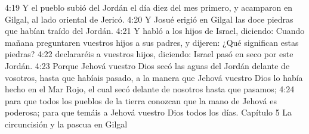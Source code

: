 4:19 Y el pueblo subió del Jordán el día diez del mes primero, y acamparon en Gilgal, al lado oriental de Jericó.  
4:20 Y Josué erigió en Gilgal las doce piedras que habían traído del Jordán.  
4:21 Y habló a los hijos de Israel, diciendo: Cuando mañana preguntaren vuestros hijos a sus padres, y dijeren: ¿Qué significan estas piedras?  
4:22 declararéis a vuestros hijos, diciendo: Israel pasó en seco por este Jordán.  
4:23 Porque Jehová vuestro Dios secó las aguas del Jordán delante de vosotros, hasta que habíais pasado, a la manera que Jehová vuestro Dios lo había hecho en el Mar Rojo, el cual secó delante de nosotros hasta que pasamos;  
4:24 para que todos los pueblos de la tierra conozcan que la mano de Jehová es poderosa; para que temáis a Jehová vuestro Dios todos los días.  
Capítulo 5 
La circuncisión y la pascua en Gilgal  

